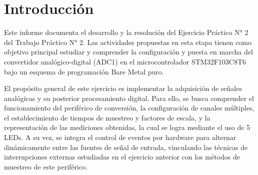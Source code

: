 \chapter{Introducción}
\label{ch:introduccion}

Este informe documenta el desarrollo y la resolución del Ejercicio Práctico N° 2 del Trabajo Práctico N° 2.
Las actividades propuestas en esta etapa tienen como objetivo principal
estudiar y comprender la configuración y puesta en marcha del convertidor analógico-digital (ADC1) en el
microcontrolador STM32F103C8T6 bajo un esquema de programación Bare Metal puro.

El propósito general de este ejercicio es implementar la adquisición de señales analógicas y su posterior
procesamiento digital. Para ello, se busca comprender el funcionamiento del periférico de conversión, la
configuración de canales múltiples, el establecimiento de tiempos de muestreo y factores de escala, y la
representación de las mediciones obtenidas, la cual se logra mediante el uso de
5 LEDs. A su vez, se integra el control de eventos por hardware
para alternar dinámicamente entre las fuentes de señal de entrada, vinculando las técnicas de interrupciones
externas estudiadas en el ejercicio anterior con los métodos de muestreo de este periférico.
